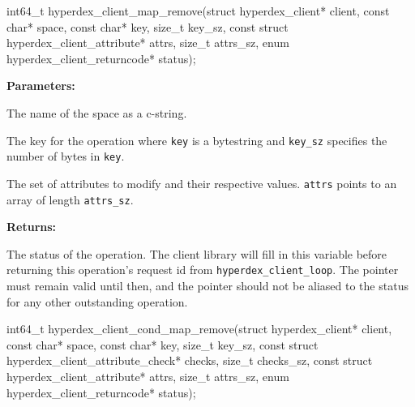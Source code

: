 \funcsep
\begin{ccode}
int64_t hyperdex_client_map_remove(struct hyperdex_client* client,
                const char* space,
                const char* key, size_t key_sz,
                const struct hyperdex_client_attribute* attrs, size_t attrs_sz,
                enum hyperdex_client_returncode* status);
\end{ccode}
\funcdesc 

\noindent\textbf{Parameters:}
\begin{description}[labelindent=\widthof{{\texttt{attrs}, \texttt{attrs\_sz}}},leftmargin=*,noitemsep,nolistsep,align=right]
\item[\texttt{space}] The name of the space as a c-string.
\item[\texttt{key}, \texttt{key\_sz}] The key for the operation where \texttt{key} is a bytestring and \texttt{key\_sz} specifies the number of bytes in \texttt{key}.
\item[\texttt{attrs}, \texttt{attrs\_sz}] The set of attributes to modify and their respective values.  \texttt{attrs} points to an array of length \texttt{attrs\_sz}.
\end{description}

\noindent\textbf{Returns:}
\begin{description}[labelindent=\widthof{{\texttt{status}}},leftmargin=*,noitemsep,nolistsep,align=right]
\item[\texttt{status}] The status of the operation.  The client library will fill in this variable before returning this operation's request id from \texttt{hyperdex\_client\_loop}.  The pointer must remain valid until then, and the pointer should not be aliased to the status for any other outstanding operation.
\end{description}

\funcsep
\begin{ccode}
int64_t hyperdex_client_cond_map_remove(struct hyperdex_client* client,
                const char* space,
                const char* key, size_t key_sz,
                const struct hyperdex_client_attribute_check* checks, size_t checks_sz,
                const struct hyperdex_client_attribute* attrs, size_t attrs_sz,
                enum hyperdex_client_returncode* status);
\end{ccode}
\funcdesc 

